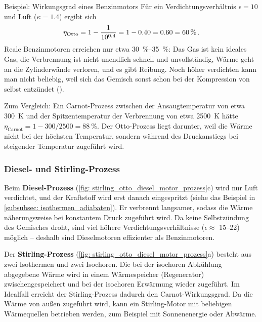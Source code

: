 \begin{examplebox}[]{Beispiel: Wirkungsgrad eines Benzinmotors}
    Für ein Verdichtungsverhältnis $\epsilon = 10$ und Luft ($\kappa = \num{1.4}$) ergibt sich
    \begin{equation*}
        \eta_\text{Otto} = 1 - \frac{1}{10^{\num{0.4}}} = 1 - \num{0.40} = \num{0.60} = \SI{60}{\percent} \,.
    \end{equation*}
    Reale Benzinmotoren erreichen nur etwa \SIrange{30}{35}{\percent}: Das Gas ist kein ideales Gas, die Verbrennung ist nicht unendlich schnell und unvollständig, Wärme geht an die Zylinderwände verloren, und es gibt Reibung. Noch höher verdichten kann man nicht beliebig, weil sich das Gemisch sonst schon bei der Kompression von selbst entzündet ().

    Zum Vergleich: Ein Carnot-Prozess zwischen der Ansaugtemperatur von etwa \SI{300}{\kelvin} und der Spitzentemperatur der Verbrennung von etwa \SI{2500}{\kelvin} hätte $\eta_\text{Carnot} = 1 - 300/2500 = \SI{88}{\percent}$. Der Otto-Prozess liegt darunter, weil die Wärme nicht bei der höchsten Temperatur, sondern während des Druckanstiegs bei steigender Temperatur zugeführt wird.
\end{examplebox}

\subsubsection*{Diesel- und Stirling-Prozess}
Beim \textbf{Diesel-Prozess} (\cref{fig: stirling_otto_diesel_motor_prozess}c) wird nur Luft verdichtet, und der Kraftstoff wird erst danach eingespritzt (siehe das Beispiel in \cref{subsubsec: isothermen_adiabaten}). Er verbrennt langsamer, sodass die Wärme näherungsweise bei konstantem Druck zugeführt wird. Da keine Selbstzündung des Gemisches droht, sind viel höhere Verdichtungsverhältnisse ($\epsilon \approx$ \numrange{15}{22}) möglich -- deshalb sind Dieselmotoren effizienter als Benzinmotoren.

Der \textbf{Stirling-Prozess} (\cref{fig: stirling_otto_diesel_motor_prozess}a) besteht aus zwei Isothermen und zwei Isochoren. Die bei der isochoren Abkühlung abgegebene Wärme wird in einem Wärmespeicher (Regenerator) zwischengespeichert und bei der isochoren Erwärmung wieder zugeführt. Im Idealfall erreicht der Stirling-Prozess dadurch den Carnot-Wirkungsgrad. Da die Wärme von außen zugeführt wird, kann ein Stirling-Motor mit beliebigen Wärmequellen betrieben werden, zum Beispiel mit Sonnenenergie oder Abwärme.



